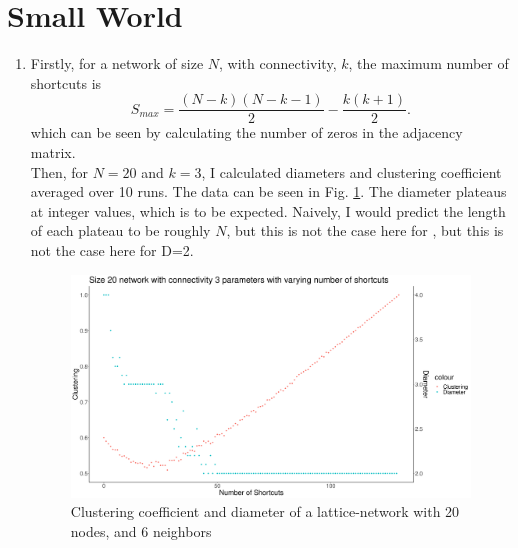 \documentclass[a4paper]{article}
\begin{document}
\pagebreak

\section{Small World}

\begin{enumerate}[label={(5. \alph*)}]
    \item 
        Firstly, for a network of size $N$, with connectivity, $k$, the maximum number of shortcuts is   
        \[
            S_{max} = \frac{(N - k)(N - k - 1)}{2} - \frac{k(k+1)}{2}
        .\] 
        which can be seen by calculating the number of zeros in the adjacency matrix. \\ Then, for $N = 20$ and $k=3$, I calculated diameters and clustering coefficient averaged over 10 runs. The data can be seen in Fig. \ref{fig:small_world}. The diameter plateaus at integer values, which is to be expected. Naively, I would predict the length of each plateau to be roughly $N$, but this is not the case here for , but this is not the case here for D=2. 
    
    \begin{figure}[h]
        \centerline{\includegraphics[width=1.3\linewidth]{./small_world.png}}
        \caption{Clustering coefficient and diameter of a lattice-network with 20 nodes, and 6 neighbors}
        \label{fig:small_world}
    \end{figure}
\end{enumerate}


\end{document}
